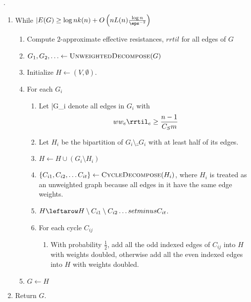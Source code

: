 \begin{algorithm}
  \caption{$\textsc{DegreePresrevingSparsify}(G, \epsilon,
  \textsc{CycleDecompose})$}.
  \begin{enumerate}
    \item While $|E(G) \geq \log{n} k(n)
      + 
      O\left( n L(n) \frac{\log n}{\eps^{-2}} \right)$
      \begin{enumerate}
        \item Compute $2$-approximate effective resistances,
          $rrtil$ for all edges of $G$
        \item $G_1, G_2, \ldots \leftarrow \textsc{UnweightedDecompose}(G)$
        \item Initialize $H \leftarrow (V, \emptyset)$.
        \item For each $G_i$
          \begin{enumerate}
            \item Let \bar{G_i} denote all edges in $G_i$ with 
              \[
                ww_e \rrtil_e \geq \frac{n-1}{C_S m}
                \]
            \item Let $H_i$ be the bipartition of $G_i \setminus \bar_{G}_i$
              with at least half of its edges.
            \item $H \leftarrow H \cup (G_i \setminus H_i)$
            \item $\{C_{i1}, C_{i2}, \ldots C_{it} \}
              \leftarrow \textsc{CycleDecompose}(H_{i})$,
              where $H_i$ is treated as an unweighted graph because all edges in
              it have the same edge weights.

            \item $H \leftarow H \setminus C_{i1} \setminus C_{i2} \ldots
              setminus C_{it}$.
            \item For each cycle $C_{ij}$
              \begin{enumerate}
                \item With probability $\frac{1}{2}$, add all the odd indexed
                  edges of $C_{ij}$ into $H$ with weights doubled,
                  otherwise add all the even indexed edges into $H$ with weights
                  doubled.
              \end{enumerate}
          \end{enumerate}
        \item $G \leftarrow H$ 
    \end{enumerate}
      \item Return $G$.
    \end{enumerate}
\end{algorithm}
